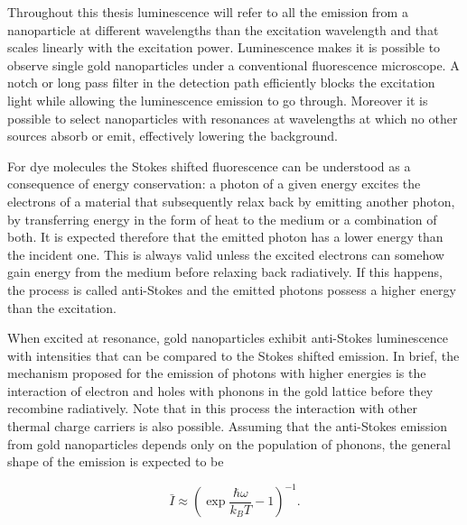 Throughout this thesis luminescence will refer to all the emission from a
nanoparticle at different wavelengths than the excitation wavelength and that
scales linearly with the excitation power. Luminescence makes it is possible to
observe single gold nanoparticles under a conventional fluorescence microscope.
A notch or long pass filter in the detection path efficiently blocks the
excitation light while allowing the luminescence emission to go through.
Moreover it is possible to select nanoparticles with resonances at wavelengths
at which no other sources absorb or emit, effectively lowering the background.


For dye molecules the Stokes shifted fluorescence can be understood as a
consequence of energy conservation: a photon of a given energy excites the
electrons of a material that subsequently relax back by emitting another photon,
by transferring energy in the form of heat to the medium or a combination of
both. It is expected therefore that the emitted photon has a lower energy than
the incident one. This is always valid unless the excited electrons can somehow
gain energy from the medium before relaxing back radiatively. If this happens,
the process is called anti-Stokes and the emitted photons possess a higher
energy than the excitation.

When excited at resonance, gold nanoparticles exhibit anti-Stokes luminescence
with intensities that can be compared to the Stokes shifted emission. In brief,
the mechanism proposed for the emission of photons with higher energies is the
interaction of electron and holes with phonons in the gold lattice before they
recombine radiatively. Note that in this process the interaction with other
thermal charge carriers is also possible. Assuming that the anti-Stokes emission
from gold nanoparticles depends only on the population of phonons, the general
shape of the emission is expected to be

\begin{equation}\label{eqn:antiStokes}
	\bar{I}\approx\left(\exp\frac{\hbar\omega}{k_BT}-1\right)^{-1}.
\end{equation}

